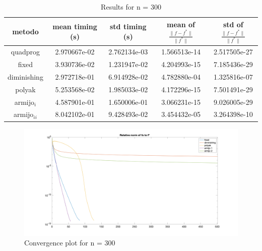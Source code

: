 
\begin{table}[H]
\setlength{\tabcolsep}{10pt} %
\renewcommand{\arraystretch}{1.2} %
\centering
\begin{tabular}{|ccccc|} 
\hline 
\multicolumn{1}{|c||}{metodo}   & \multicolumn{1}{c|}{mean timing (s)}    & \multicolumn{1}{c|}{std timing (s)} & \multicolumn{1}{c|}{mean of $\frac{\|f - f^*\|}{\|f^*\|}$}   & std of $\frac{\|f - f^*\|}{\|f^*\|}$ \\ \hline\hline 
\multicolumn{1}{|c||}{quadprog}       & \multicolumn{1}{c|}{2.970667e-02} & \multicolumn{1}{c|}{2.762134e-03}  & \multicolumn{1}{c|}{1.566513e-14} & 2.517505e-27  \\ \hline \hline
\multicolumn{1}{|c||}{fixed}       & \multicolumn{1}{c|}{3.930736e-02} & \multicolumn{1}{c|}{1.231947e-02}  & \multicolumn{1}{c|}{4.204993e-15} & 7.185436e-29  \\ \hline 
\multicolumn{1}{|c||}{diminishing}       & \multicolumn{1}{c|}{2.972718e-01} & \multicolumn{1}{c|}{6.914928e-02}  & \multicolumn{1}{c|}{4.782880e-04} & 1.325816e-07  \\ \hline 
\multicolumn{1}{|c||}{polyak}       & \multicolumn{1}{c|}{5.253568e-02} & \multicolumn{1}{c|}{1.985033e-02}  & \multicolumn{1}{c|}{4.172296e-15} & 7.501491e-29  \\ \hline 
\multicolumn{1}{|c||}{armijo$_{i}$}       & \multicolumn{1}{c|}{4.587901e-01} & \multicolumn{1}{c|}{1.650006e-01}  & \multicolumn{1}{c|}{3.066231e-15} & 9.026005e-29  \\ \hline 
\multicolumn{1}{|c||}{armijo$_{ii}$}       & \multicolumn{1}{c|}{8.042102e-01} & \multicolumn{1}{c|}{9.428493e-02}  & \multicolumn{1}{c|}{3.454432e-05} & 3.264398e-10  \\ \hline 
\end{tabular}

\caption{Results for n = 300}
\label{tab:300}
\end{table}


\begin{figure}[H]
\centering
    \includegraphics[width=20cm, center]{./plots/plot_300.png}
    \caption{Convergence plot for n = 300}
    \label{fig:300}
\end{figure} 

